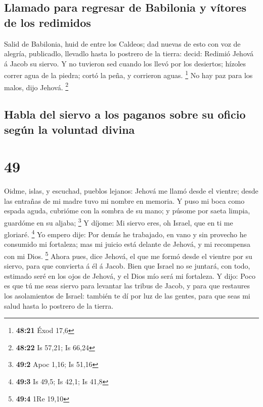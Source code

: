 \hypertarget{llamado-para-regresar-de-babilonia-y-vuxedtores-de-los-redimidos}{%
\subsection{Llamado para regresar de Babilonia y vítores de los
redimidos}\label{llamado-para-regresar-de-babilonia-y-vuxedtores-de-los-redimidos}}

 Salid de Babilonia, huid de entre los Caldeos; dad
nuevas de esto con voz de alegría, publicadlo, llevadlo hasta lo
postrero de la tierra: decid: Redimió Jehová á Jacob su siervo.
 Y no tuvieron sed cuando los llevó por los desiertos;
hízoles correr agua de la piedra; cortó la peña, y corrieron aguas.
\footnote{\textbf{48:21} Éxod 17,6}  No hay paz para los
malos, dijo Jehová. \footnote{\textbf{48:22} Is 57,21; Is 66,24}

\hypertarget{habla-del-siervo-a-los-paganos-sobre-su-oficio-seguxfan-la-voluntad-divina}{%
\subsection{Habla del siervo a los paganos sobre su oficio según la
voluntad
divina}\label{habla-del-siervo-a-los-paganos-sobre-su-oficio-seguxfan-la-voluntad-divina}}

\hypertarget{section-48}{%
\section{49}\label{section-48}}

 Oidme, islas, y escuchad, pueblos lejanos: Jehová me
llamó desde el vientre; desde las entrañas de mi madre tuvo mi nombre en
memoria.  Y puso mi boca como espada aguda, cubrióme con
la sombra de su mano; y púsome por saeta limpia, guardóme en su aljaba;
\footnote{\textbf{49:2} Apoc 1,16; Is 51,16}  Y díjome: Mi
siervo eres, oh Israel, que en ti me gloriaré. \footnote{\textbf{49:3}
  Is 49,5; Is 42,1; Is 41,8}  Yo empero dije: Por demás he
trabajado, en vano y sin provecho he consumido mi fortaleza; mas mi
juicio está delante de Jehová, y mi recompensa con mi Dios. \footnote{\textbf{49:4}
  1Re 19,10}  Ahora pues, dice Jehová, el que me formó
desde el vientre por su siervo, para que convierta á él á Jacob. Bien
que Israel no se juntará, con todo, estimado seré en los ojos de Jehová,
y el Dios mío será mi fortaleza.  Y dijo: Poco es que tú
me seas siervo para levantar las tribus de Jacob, y para que restaures
los asolamientos de Israel: también te dí por luz de las gentes, para
que seas mi salud hasta lo postrero de la tierra.

